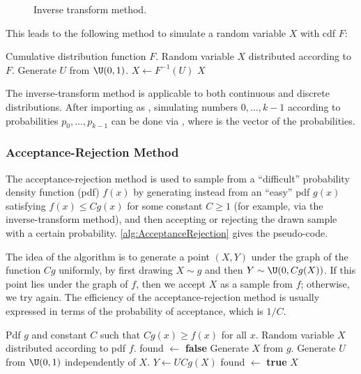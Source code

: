 \begin{figure}[H]
	\centering
	
	\caption{Inverse transform method.}
	\label{fig:inverseTransformMethod}
\end{figure}

This leads to the following method to simulate a random variable $X$ with cdf $F$:

\begin{algorithm}[H]
	\caption{Inverse-Transform Method}
	\begin{algorithmic}[1]
		\Require Cumulative distribution function $F$.
		\Ensure Random variable $X$ distributed according to $F$.
		\State Generate $U$ from $\U(0, 1)$.
		\State $X \gets F^{-1}(U)$
		\State \Return $X$
	\end{algorithmic}
\end{algorithm}

\begin{xtip}
	The inverse-transform method is applicable to both continuous and discrete distributions. After importing  as , simulating numbers $0, \dots, k - 1$ according to probabilities $p_0, \dots, p_{k-1}$ can be done via , where  is the vector of the probabilities.
\end{xtip}

\subsubsection{Acceptance-Rejection Method}
The acceptance-rejection method is used to sample from a ``difficult'' probability density function (pdf) $f(x)$ by generating instead from an ``easy'' pdf $g(x)$ satisfying $f(x) \le C g(x)$ for some constant $C \ge 1$ (for example, via the inverse-transform method), and then accepting or rejecting the drawn sample with a certain probability. \cref{alg:AcceptanceRejection} gives the pseudo-code.

The idea of the algorithm is to generate a point $(X, Y)$ under the graph of the function $Cg$ uniformly, by first drawing $X \sim g$ and then $Y \sim \U(0, Cg(X))$. If this point lies under the graph of $f$, then we accept $X$ as a sample from $f$; otherwise, we try again. The efficiency of the acceptance-rejection method is usually expressed in terms of the probability of acceptance, which is $1/C$.

\begin{algorithm}[H]
	\caption{Acceptance-Rejection Method}
	\label{alg:AcceptanceRejection}
	\begin{algorithmic}[1]
		\Require Pdf $g$ and constant $C$ such that $Cg(x) \ge f(x)$ for all $x$.
		\Ensure Random variable $X$ distributed according to pdf $f$.
		\State found $\gets$ \textbf{false}
		\State Generate $X$ from $g$.
		\State Generate $U$ from $\U(0, 1)$ independently of $X$.
		\State $Y \gets U C g(X)$
		\State found $\gets$ \textbf{true}
		\EndIf
		\EndWhile
		\State \Return $X$
	\end{algorithmic}
\end{algorithm}

